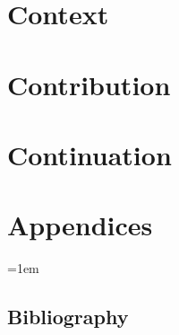 \documentclass[11pt,a4paper]{book}
\begin{document}
\listoftables
\label{list.of.tables}

\cleardoublepage


\part{Context}
\label{part:context}



\cleardoublepage



\cleardoublepage


\part{Contribution}
\label{part:contribution}



\cleardoublepage



\cleardoublepage




\part{Continuation}
\label{part:continuation}

\cleardoublepage



\cleardoublepage


\part{Appendices}
\label{part:annexes}

\appendix

\emergencystretch=1em

\chapter{Bibliography}
\label{chap:bibliography}

\nocite{*}

\printbibliography[category=cited,heading=bibintoc,title={References}]
\printbibliography[notcategory=cited,heading=bibintoc,title={Further reading}]

\cleardoublepage




\end{document}

